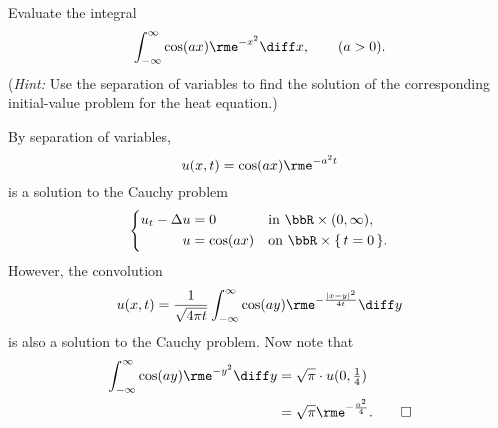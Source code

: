 \begin{problem}
  Evaluate the integral
  \[
    \int_{-\infty}^\infty \cos(ax)\rme^{-x^2}\diff x,\qquad (a>0).
  \]
  \noindent (\emph{Hint:} Use the separation of variables to find the
  solution of the corresponding initial-value problem for the heat
  equation.)
\end{problem}
\begin{solution}
  By separation of variables,
  \[
    u(x,t)=\cos(ax)\rme^{-a^2t}
  \]
  is a solution to the Cauchy problem
  \[
    \left\{
      \begin{aligned}
        u_t-\Delta u&=0&&\text{in \(\bbR\times(0,\infty)\),}\\
        u&=\cos(ax)&&\text{on \(\bbR\times\{\,t=0\,\}\).}
      \end{aligned}
    \right.
  \]
  However, the convolution
  \[
    u(x,t)=%
    \frac{1}{\sqrt{4\pi t}}\int_{-\infty}^\infty%
    \cos(a y)\rme^{-\frac{|x-y|^2}{4t}}\diff y
  \]
  is also a solution to the Cauchy problem. Now note that
  \begin{align*}
    \int_{-\infty}^\infty\cos(ay)\rme^{-y^2}\diff y
    &=\sqrt{\pi}\cdot u(0,\tfrac{1}{4})\\
    &=\sqrt{\pi}\rme^{-\frac{a^2}{4}}.\qedhere
  \end{align*}
\end{solution}

